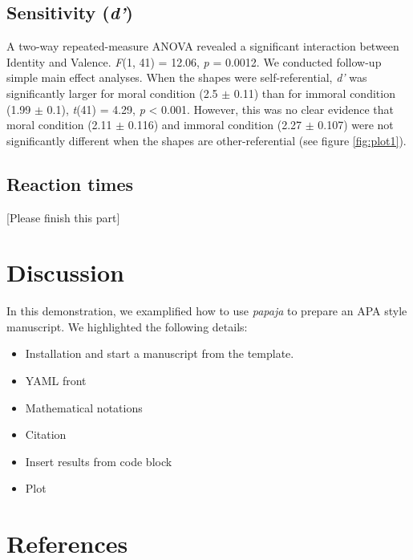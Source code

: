 \documentclass[
  man]{apa6}
\providecommand{\tightlist}{%
  \setlength{\itemsep}{0pt}\setlength{\parskip}{0pt}}
\begin{document}
\subsection{\texorpdfstring{Sensitivity (\emph{d'})}{Sensitivity (d')}}\label{sensitivity-d}

A two-way repeated-measure ANOVA revealed a significant interaction between Identity and Valence. \emph{F}(1, 41) = 12.06, \emph{p} = 0.0012. We conducted follow-up simple main effect analyses. When the shapes were self-referential, \emph{d'} was significantly larger for moral condition (2.5 \(\pm\) 0.11) than for immoral condition (1.99 \(\pm\) 0.1), \emph{t}(41) = 4.29, \emph{p} \textless{} 0.001. However, this was no clear evidence that moral condition (2.11 \(\pm\) 0.116) and immoral condition (2.27 \(\pm\) 0.107) were not significantly different when the shapes are other-referential (see figure \ref{fig:plot1}).

\subsection{Reaction times}\label{reaction-times}

{[}Please finish this part{]}

\section{Discussion}\label{discussion}

In this demonstration, we examplified how to use \emph{papaja} to prepare an APA style manuscript. We highlighted the following details:

\begin{itemize}
\tightlist
\item
  Installation and start a manuscript from the template.
\item
  YAML front
\item
  Mathematical notations
\item
  Citation
\item
  Insert results from code block
\item
  Plot
\end{itemize}

\newpage

\section{References}\label{references}
\end{document}
